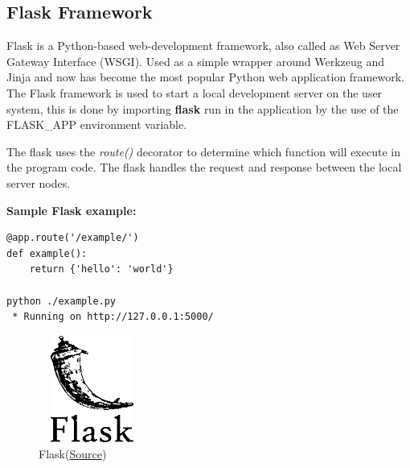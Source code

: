 \documentclass[12pt]{article}
\begin{document}
\subsection{Flask Framework}
Flask is a Python-based web-development framework, also called as Web Server Gateway Interface (WSGI). Used as a simple wrapper around Werkzeug and Jinja and now has become the most popular Python web application framework. The Flask framework is used to start a local development server on the user system, this is done by importing \textbf{flask} run in the application by the use of the FLASK\_APP environment variable.
\begin{flushleft}
The flask uses the \emph{route()} decorator to determine which function will execute in the program code. The flask handles the request and response between the local server nodes.
\end{flushleft} \par
\textbf{Sample Flask example:}
\begin{lstlisting}
@app.route('/example/')
def example():
    return {'hello': 'world'}

python ./example.py
 * Running on http://127.0.0.1:5000/
\end{lstlisting}
\begin{figure}
    \centering
    \includegraphics[width=3.5cm, height=3.5cm]{../report_MemeEcon/images/flask.png}
    \caption{Flask(\href{https://palletsprojects.com/p/flask/}{Source})}
    \label{fig:Flask}
\end{figure}
\end{document}
